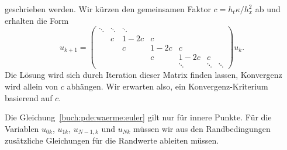geschrieben werden.
Wir kürzen den gemeinsamen Faktor $c=h_t\kappa/h_x^2$ ab und erhalten
die Form
\[
u_{k+1}
=
\begin{pmatrix}
\ddots&\ddots&\ddots&    &      &      &      \\
      &     c&  1-2c&  c &      &      &      \\
      &      &    c &1-2c&  c   &      &      \\
      &      &      &  c &1-2c  &  c   &      \\
      &      &      &    &\ddots&\ddots&\ddots
\end{pmatrix}
u_k.
\]
Die Lösung wird sich durch Iteration dieser Matrix finden lassen,
Konvergenz wird allein von $c$ abhängen.
Wir erwarten also, ein Konvergenz-Kriterium basierend auf $c$.

Die Gleichung~\eqref{buch:pde:waerme:euler} gilt nur für innere Punkte.
Für die Variablen $u_{0k}$, $u_{1k}$, $u_{N-1,k}$ und $u_{Nk}$ müssen
wir aus den Randbedingungen zusätzliche Gleichungen für die Randwerte
ableiten müssen.

